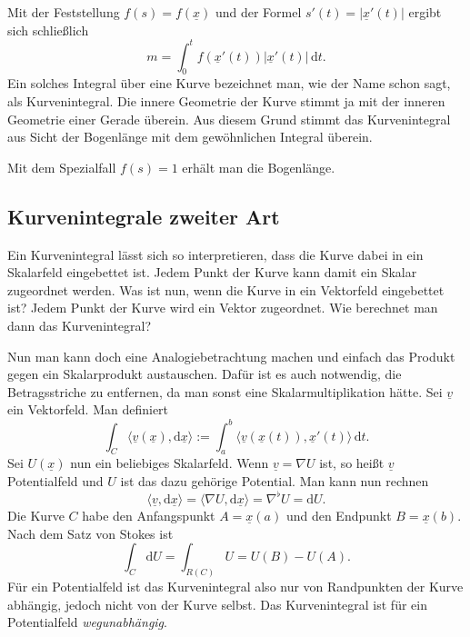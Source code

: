\documentclass[a4paper,10pt,fleqn,twocolumn,twoside]{article}
\numberwithin{equation}{section}
\begin{document}
Mit der Feststellung $f(s) = f(\underline x)$ und der Formel
$s'(t) = |\underline x'(t)|$ ergibt sich schließlich
\begin{equation}
m = \int_0^t f(\underline x'(t))|\underline x'(t)|\,\mathrm dt.
\end{equation}
Ein solches Integral über eine Kurve bezeichnet man, wie der Name
schon sagt, als Kurvenintegral. Die innere Geometrie der Kurve stimmt
ja mit der inneren Geometrie einer Gerade überein. Aus diesem Grund
stimmt das Kurvenintegral aus Sicht der Bogenlänge mit dem
gewöhnlichen Integral überein.

Mit dem Spezialfall $f(s)=1$ erhält
man die Bogenlänge.



\subsection{Kurvenintegrale zweiter Art}

Ein Kurvenintegral lässt sich so interpretieren, dass die Kurve
dabei in ein Skalarfeld eingebettet ist. Jedem Punkt der Kurve
kann damit ein Skalar zugeordnet werden. Was ist nun, wenn die
Kurve in ein Vektorfeld eingebettet ist? Jedem Punkt der Kurve
wird ein Vektor zugeordnet. Wie berechnet man dann das Kurvenintegral?

Nun man kann doch eine Analogiebetrachtung machen und einfach das
Produkt gegen ein Skalarprodukt austauschen. Dafür ist es auch
notwendig, die Betragsstriche zu entfernen, da man sonst eine
Skalarmultiplikation hätte. Sei $\underline v$ ein Vektorfeld.
Man definiert
\begin{equation}
\int_C \langle\underline v(\underline x),\mathrm d\underline x\rangle
:= \int_{a}^{b} \langle\underline v(\underline x(t)),
\underline x'(t)\rangle\,\mathrm dt.
\end{equation}
Sei $U(\underline x)$ nun ein beliebiges Skalarfeld. Wenn
$\underline v=\nabla U$ ist, so heißt $\underline v$ Potentialfeld
und $U$ ist das dazu gehörige Potential. Man kann nun rechnen
\begin{equation}
\langle\underline v,\mathrm d\underline x\rangle
= \langle\nabla U,\mathrm d\underline x\rangle
= \nabla^\flat U
= \mathrm dU.
\end{equation}
Die Kurve $C$ habe den Anfangspunkt $A=\underline x(a)$ und den
Endpunkt $B=\underline x(b)$. Nach dem Satz von Stokes ist
\begin{equation}
\int_C \mathrm dU = \int_{R(C)} U = U(B)-U(A).
\end{equation}
Für ein Potentialfeld ist das Kurvenintegral also nur von Randpunkten
der Kurve abhängig, jedoch nicht von der Kurve selbst. Das Kurvenintegral
ist für ein Potentialfeld \textit{wegunabhängig}.
\end{document}
